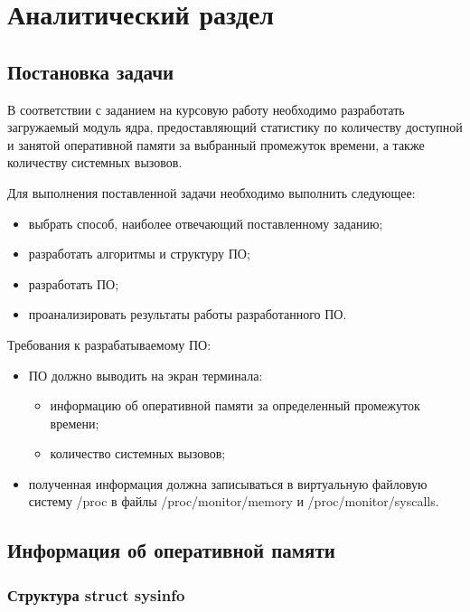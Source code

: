 \section{Аналитический раздел}

\subsection{Постановка задачи}

В соответствии с заданием на курсовую работу необходимо разработать загружаемый модуль ядра, предоставляющий статистику по количеству доступной и занятой оперативной памяти за выбранный промежуток времени, а также количеству системных вызовов.

Для выполнения поставленной задачи необходимо выполнить следующее:

\begin{itemize}
	\item выбрать способ, наиболее отвечающий поставленному заданию;
	\item разработать алгоритмы и структуру ПО;
	\item разработать ПО;
	\item проанализировать результаты работы разработанного ПО.
\end{itemize}

Требования к разрабатываемому ПО:
\begin{itemize}
	\item ПО должно выводить на экран терминала:
	
	\begin{itemize}
		\item информацию об оперативной памяти за определенный промежуток времени;
		
		\item количество системных вызовов;
	\end{itemize}
	
	\item полученная информация должна записываться в виртуальную файловую систему /proc в файлы /proc/monitor/memory и /proc/monitor/syscalls.
\end{itemize}

\subsection{Информация об оперативной памяти}

\subsubsection{Структура struct sysinfo}

